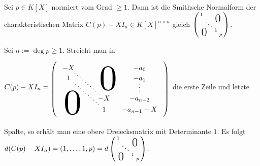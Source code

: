 \documentclass[../../main.tex]{subfiles}
\begin{document}
\begin{lem}\label{17.5.2}
Sei $p\in K[X]$ normiert vom Grad $\ge 1$. Dann ist die Smithsche Normalform der charakteristischen Matrix $C(p)-XI_n\in K[X]^{n\times n}$ gleich $\left(\begin{smallmatrix}
1 & & &\llap{$\overset{\blap{\LARGE 0}}{~}$} \\
& \ddots & &\\
& & 1 &\\
\rlap{\tlap{\LARGE 0}}& & & p
\end{smallmatrix}\right)$.
\end{lem}
\begin{cproof}
Sei $n:=\deg p\ge 1$. Streicht man in $C(p)-XI_n=
\begin{tikzpicture}[loosely dotted,thick,baseline]
\matrix (m) [matrix of math nodes,nodes in empty cells,right delimiter=),left delimiter=(,column sep=1em]{
-X&&&-a_0\\
1&&&-a_1\\
&&&\\
&&&\\
&&-X&-a_{n-2}\\
&&1&-a_{n-1}-X\\
} ;
\node at (m-1-3.south) [anchor=center, xshift=0.2cm,yshift=-0.3cm,  xscale=5, yscale=5] {$0$};
\node at (m-6-1.north) [anchor=center, xshift=0.2cm,yshift=0.3cm,  xscale=5, yscale=5] {$0$};
\draw (m-2-4)-- (m-5-4);
\draw (m-1-1)-- (m-5-3);
\draw (m-2-1)-- (m-6-3);
\end{tikzpicture}$ die erste Zeile und letzte Spalte, so erhält man eine obere Dreiecksmatrix mit Determinante $1$. Es folgt $d(C(p)-XI_n)=(1,\ldots ,1,p)=d\left(\begin{smallmatrix}
1 & & &\llap{$\overset{\blap{\LARGE 0}}{~}$} \\
& \ddots & &\\
& & 1 &\\
\rlap{\tlap{\LARGE 0}}& & & p
\end{smallmatrix}\right)$.
\end{cproof}
\end{document}
